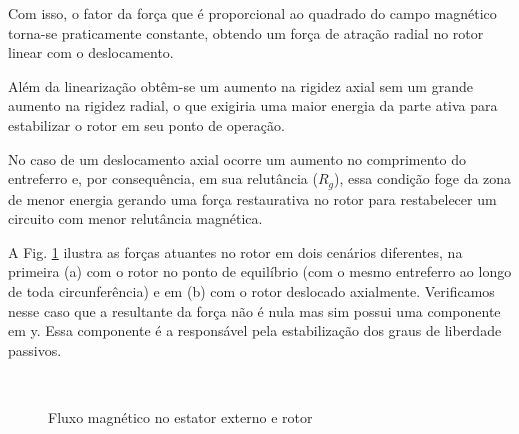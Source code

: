 Com isso, o fator da força que é proporcional ao quadrado do campo magnético torna-se praticamente constante, obtendo um força de atração radial no rotor linear com o deslocamento.

Além da linearização obtêm-se um aumento na rigidez axial sem um grande aumento na rigidez radial, o que exigiria uma maior energia da parte ativa para estabilizar o rotor em seu ponto de operação. 

No caso de um deslocamento axial ocorre um aumento no comprimento do entreferro e, por consequência, em sua relutância ($R_{g}$), essa condição foge da zona de menor energia gerando uma força restaurativa no rotor para restabelecer um circuito com menor relutância magnética.

A Fig. \ref{fig:modelo:circuito:passivo:forcas} ilustra as forças atuantes no rotor em dois cenários diferentes, na primeira (a) com o rotor no ponto de equilíbrio (com o mesmo entreferro ao longo de toda circunferência) e em (b) com o rotor deslocado axialmente. Verificamos nesse caso que a resultante da força não é nula mas sim possui uma componente em y. Essa componente é a responsável pela estabilização dos graus de liberdade passivos.

\begin{figure}[th!]
\centering
{} \\
\caption{Fluxo magnético no estator externo e rotor}
\label{fig:modelo:circuito:passivo:forcas}
\end{figure}

